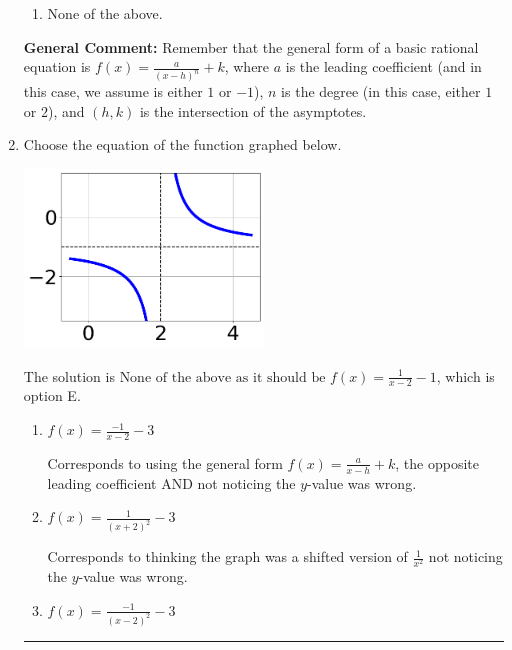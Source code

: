 \documentclass{extbook}[14pt]
\newcommand{\litem}[1]{\item #1

\rule{\textwidth}{0.4pt}}
\begin{document}
\begin{enumerate}
{\begin{enumerate}[label=\Alph*.]
\item None of the above.\end{enumerate}
\textbf{General Comment:} Remember that the general form of a basic rational equation is $ f(x) = \frac{a}{(x-h)^n} + k$, where $a$ is the leading coefficient (and in this case, we assume is either $1$ or $-1$), $n$ is the degree (in this case, either $1$ or $2$), and $(h, k)$ is the intersection of the asymptotes.
}
\litem{
Choose the equation of the function graphed below.

\begin{center}
    \includegraphics[width=0.5\textwidth]{../Figures/rationalGraphToEquationCopyB.png}
\end{center}


The solution is \( \text{None of the above as it should be } f(x) = \frac{1}{x - 2} - 1 \), which is option E.\begin{enumerate}[label=\Alph*.]
\item \( f(x) = \frac{-1}{x - 2} - 3 \)

Corresponds to using the general form $f(x) = \frac{a}{x-h}+k$, the opposite leading coefficient AND not noticing the $y$-value was wrong.
\item \( f(x) = \frac{1}{(x + 2)^2} - 3 \)

Corresponds to thinking the graph was a shifted version of $\frac{1}{x^2}$ not noticing the $y$-value was wrong.
\item \( f(x) = \frac{-1}{(x - 2)^2} - 3 \)


\end{enumerate}}
\end{enumerate}
\end{document}
